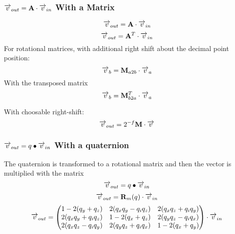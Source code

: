 \subsubsection*{$\overrightarrow{v}_{out} = \mathbf{A} \cdot \overrightarrow{v}_{in}$ With a Matrix}
\begin{equation}
\overrightarrow{v}_{out} = \mathbf{A} \cdot \overrightarrow{v}_{in}
\end{equation}
\begin{equation}
\overrightarrow{v}_{out} = \mathbf{A}^{T} \cdot \overrightarrow{v}_{in}
\end{equation}
For rotational matrices, with additional right shift about the decimal point position:
\begin{equation}
\overrightarrow{v}_b = \mathbf{M}_{a2b} \cdot \overrightarrow{v}_a
\end{equation}
With the transposed matrix
\begin{equation}
\overrightarrow{v}_b = \mathbf{M}_{b2a}^{T} \cdot \overrightarrow{v}_a
\end{equation}

With choosable right-shift:
\begin{equation}
\overrightarrow{v}_{out} = 2^{-f} \mathbf{M} \cdot \overrightarrow{v}
\end{equation}

\subsubsection*{$\overrightarrow{v}_{out} = q_{} \bullet \overrightarrow{v}_{in}$ With a quaternion}
The quaternion is transformed to a rotational matrix and then the vector is multiplied with the matrix
\begin{equation}
\overrightarrow{v}_{out} = q_{} \bullet \overrightarrow{v}_{in}
\end{equation}
\begin{equation}
\overrightarrow{v}_{out} = \mathbf{R}_m(q_{}) \cdot \overrightarrow{v}_{in}
\end{equation}
\begin{equation}
\overrightarrow{v}_{out} = \begin{pmatrix}
1-2(q_y + q_z)		& 2(q_xq_y-q_iq_z)	& 2(q_xq_z + q_iq_y) \\
2(q_xq_y + q_iq_z)	& 1-2(q_x + q_z)	& 2(q_yq_z - q_iq_x) \\
2(q_xq_z - q_iq_y)	& 2(q_yq_z+q_iq_x)	& 1-2(q_x + q_y)	
\end{pmatrix}
 \cdot \overrightarrow{v}_{in}
\end{equation}



